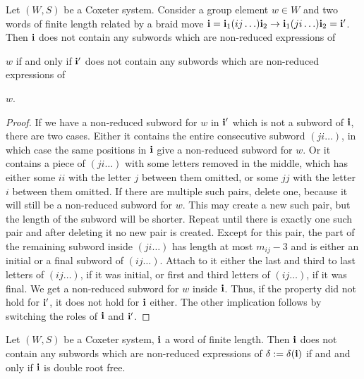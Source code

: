 

\begin{lemma}
\label{lem:braid_invariance_property_2}
Let $(W, S)$ be a Coxeter system. Consider a group element $w \in W$ and two words of finite length related by a braid move  $\mathbf{i} = \mathbf{i}_1 (ij \ldots) \mathbf{i}_2 \to \mathbf{i}_1 (j i \ldots) \mathbf{i}_2 = \mathbf{i}'$.
Then $\mathbf{i}$ does not contain any subwords which are non-reduced expressions of 

$w$
 if and only if $\mathbf{i}'$ does not contain any subwords which are non-reduced expressions of 
 
 $w$.
 \end{lemma}



\begin{proof}
 If we have a non-reduced  subword for $w$ in $\mathbf{i}'$ which is not a subword of $\mathbf{i}$, there are two cases. Either it contains the entire consecutive subword $(ji \ldots)$, in which case the same positions in $\mathbf{i}$ give a non-reduced  subword for $w$. 
 Or it contains a piece of $(ji \ldots)$ with some letters removed in the middle, which  has either some $ii$ with the letter $j$ between them omitted, or some $j j$ with the letter $i$ between them omitted. 
 If there are multiple such pairs, delete one, because it will still be a non-reduced subword for $w$. 
 This may create a new such pair, but the length of the subword will be shorter. 
 Repeat until there is exactly one such pair and after deleting it no new pair is created.  
 Except for this pair, the part of the remaining subword inside $(ji \ldots)$ has length at most $m_{ij} - 3$ and is either an initial or a final subword of $(i j \ldots)$. 
 Attach to it either the last and third to last letters of $(ij \ldots)$, if it was initial, or first and third letters of $(ij \ldots)$, if it was final.
We get a non-reduced subword for $w$ inside $\mathbf{i}$. 
Thus, if the property did not hold for $\mathbf{i}'$, it does not hold for $\mathbf{i}$ either. The other implication follows by switching the roles of $\mathbf{i}$ and $\mathbf{i}'$.
\end{proof}

\begin{proposition}
\label{prop:no_nonreduced_double_root_free}
Let $(W, S)$ be a Coxeter system, $\mathbf{i}$ a word of finite length. Then $\mathbf{i}$ does not contain any subwords which are non-reduced expressions of $\operatorname{\delta} := \operatorname{\delta}(\mathbf{i})$ if and and only if $\mathbf{i}$ is double root free.
\end{proposition}

